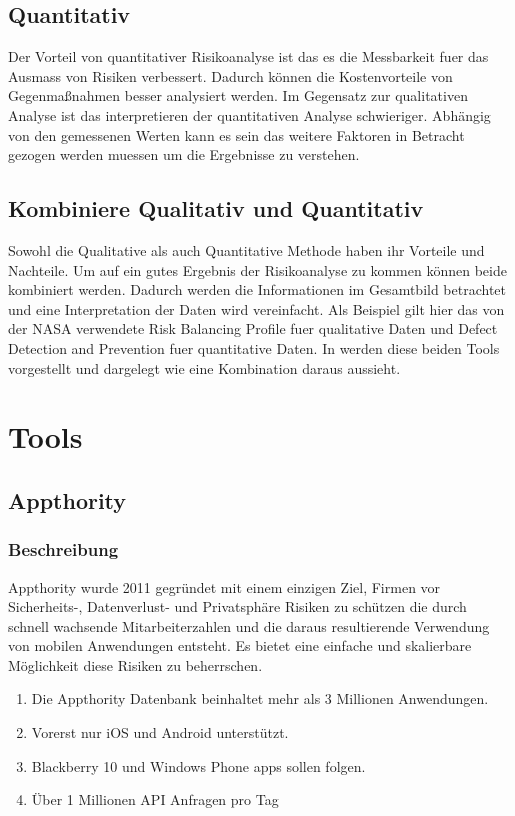 \subsection{Quantitativ}
Der Vorteil von quantitativer Risikoanalyse ist das es die Messbarkeit fuer das Ausmass von Risiken verbessert. Dadurch können die Kostenvorteile von Gegenmaßnahmen besser analysiert werden.
Im Gegensatz zur qualitativen Analyse ist das interpretieren der quantitativen Analyse schwieriger. Abhängig von den gemessenen Werten kann es sein das weitere Faktoren in Betracht gezogen werden muessen um die Ergebnisse zu verstehen.\cite{Stoneburner2002}

\subsection{Kombiniere Qualitativ und Quantitativ}
Sowohl die Qualitative als auch Quantitative Methode haben ihr Vorteile und Nachteile. Um auf ein gutes Ergebnis der Risikoanalyse zu kommen können beide kombiniert werden. Dadurch werden die Informationen im Gesamtbild betrachtet und eine Interpretation der Daten wird vereinfacht. Als Beispiel gilt hier das von der NASA verwendete Risk Balancing Profile fuer qualitative Daten und Defect Detection and Prevention fuer quantitative Daten. In \cite{Feather2000} werden diese beiden Tools vorgestellt und dargelegt wie eine Kombination daraus aussieht.

\section{Tools}
\subsection{Appthority}

\subsubsection{Beschreibung}
Appthority wurde 2011 gegründet mit einem einzigen Ziel, Firmen vor Sicherheits-, Datenverlust- und Privatsphäre Risiken zu schützen die durch schnell wachsende Mitarbeiterzahlen und die daraus resultierende Verwendung von mobilen Anwendungen entsteht. Es bietet eine einfache und skalierbare Möglichkeit diese Risiken zu beherrschen.\cite{AppthorityBlog}\cite{Appthority}

\begin{enumerate}
\item Die Appthority Datenbank beinhaltet mehr als 3 Millionen Anwendungen.
\item Vorerst nur iOS und Android unterstützt.
\item Blackberry 10 und Windows Phone apps sollen folgen.
\item Über 1 Millionen API Anfragen pro Tag
\end{enumerate}

